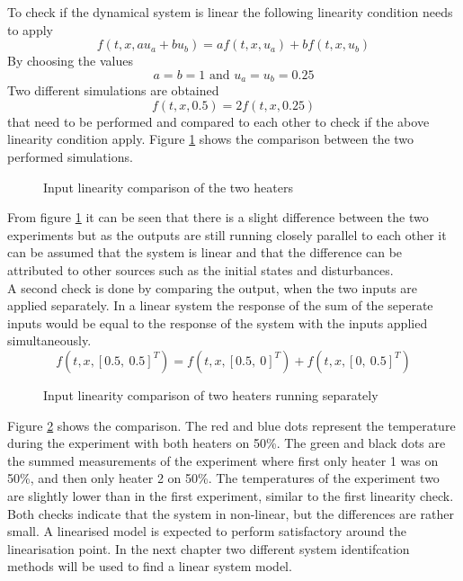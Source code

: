 To check if the dynamical system is linear the following linearity condition needs to apply
$$
f(t,x,au_a+bu_b) = af(t,x,u_a) + bf(t,x,u_b)
$$
By choosing the values 
$$
a = b = 1 \text{ and } u_a = u_b = 0.25
$$
Two different simulations are obtained
$$
f(t,x,0.5) = 2f(t,x,0.25)
$$
that need to be performed and compared to each other to check if the above linearity condition apply.
Figure \ref{fig:LinComp} shows the comparison between the two performed simulations.

\begin{figure}[ht]
    \centering
    
    \caption{Input linearity comparison of the two heaters}
    \label{fig:LinComp}
\end{figure}

From figure \ref{fig:LinComp} it can be seen that there is a slight difference between the two experiments but as the outputs are still running closely parallel to each other it can be assumed that the system is linear and that the difference can be attributed to other sources such as the initial states and disturbances.\\ 

A second check is done by comparing the output, when the two inputs are applied separately. In a linear system the response of the sum of the seperate inputs would be equal to the response of the system with the inputs applied simultaneously.
$$
f(t,x,[0.5, \ 0.5]^T) = f(t,x,[0.5, \ 0]^T) + f(t,x,[0, \ 0.5]^T)
$$
\begin{figure}[ht]
    \centering
    
    \caption{Input linearity comparison of two heaters running separately}
    \label{fig:linComp2}
\end{figure}

Figure \ref{fig:linComp2} shows the comparison. The red and blue dots represent the temperature during the experiment with both heaters on 50\%. The green and black dots are the summed measurements of the experiment where first only heater 1 was on 50\%, and then only heater 2 on 50\%. The temperatures of the experiment two are slightly lower than in the first experiment, similar to the first linearity check. \\

Both checks indicate that the system in non-linear, but the differences are rather small. A linearised model is expected to perform satisfactory around the linearisation point. In the next chapter two different system identifcation methods will be used to find a linear system model.

